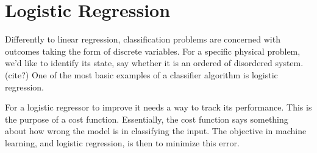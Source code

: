 %
%
%
%
%
%
\section{Logistic Regression}\label{seq:logistic}
Differently to linear regression, classification problems
are concerned with outcomes taking the form of discrete variables.
For a specific physical problem, we'd like to identify its state, say whether
it is an ordered of disordered system. (cite?) One of the most basic examples
of a classifier algorithm is logistic regression.

For a logistic regressor to improve it needs a way to
track its performance. This is the purpose of a cost function. Essentially,
the cost function says something about how wrong the model is in classifying the
input. The objective in machine learning, and logistic regression, is then to minimize
this error.

